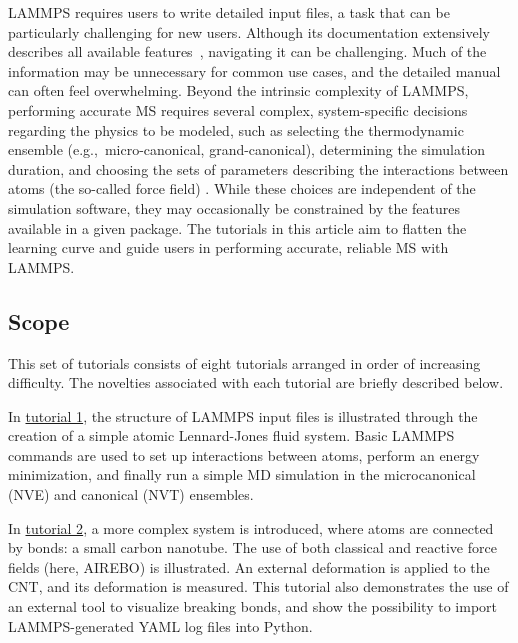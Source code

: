 \documentclass[9pt,tutorial]{livecoms}
\begin{document}
LAMMPS requires users to write detailed input files, a task that
can be particularly challenging for new users.  Although its
documentation extensively describes all available features~\cite{lammps_docs},
navigating it can be challenging.  Much of the information may be
unnecessary for common use cases, and the detailed manual can
often feel overwhelming.  Beyond the intrinsic complexity of LAMMPS, performing accurate
MS requires several complex, system-specific decisions regarding
the physics to be modeled, such as selecting the thermodynamic
ensemble (e.g.,~micro-canonical, grand-canonical), determining the
simulation duration, and choosing the sets of parameters describing the
interactions between atoms (the so-called force field)
\cite{wong2016good, van2018validation, prasad2018best}.  While these choices are independent of the
simulation software, they may occasionally be constrained by the
features available in a given package.  The tutorials in this
article aim to flatten the learning curve and guide users in
performing accurate, reliable MS with LAMMPS.

\subsection{Scope}

This set of tutorials consists of eight tutorials arranged in order of
increasing difficulty.  The novelties associated with each tutorial are
briefly described below.

In \hyperref[lennard-jones-label]{tutorial 1}, the structure of LAMMPS
input files is illustrated through the creation of a simple atomic
Lennard-Jones fluid system.  Basic LAMMPS commands are used to set up
interactions between atoms, perform an energy minimization, and finally
run a simple MD simulation in the microcanonical (NVE) and canonical (NVT)
ensembles.

In \hyperref[carbon-nanotube-label]{tutorial 2}, a more complex system
is introduced, where atoms are connected by bonds: a small carbon
nanotube.  The use of both classical and reactive force fields (here,
AIREBO) is illustrated.  An external deformation is applied to the CNT,
and its deformation is measured.  This tutorial also demonstrates the use
of an external tool to visualize breaking bonds, and show the possibility
to import LAMMPS-generated YAML log files into Python. %
\end{document}

